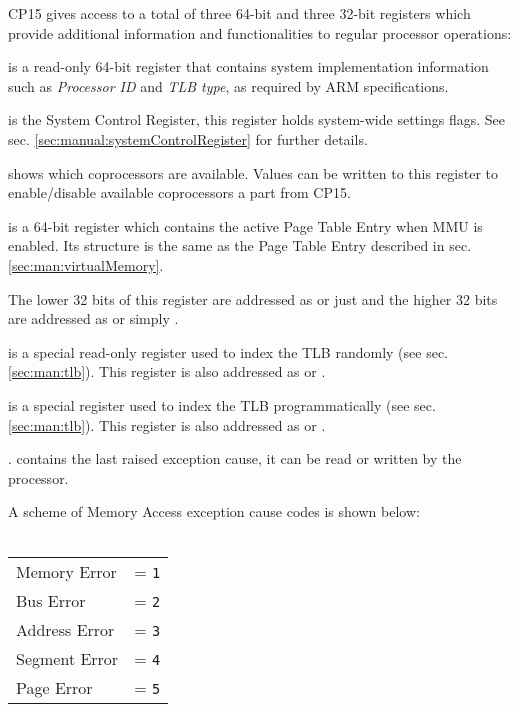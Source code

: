 

CP15 gives access to a total of three 64-bit and three 32-bit registers which provide additional information and functionalities to regular processor operations:

 is a read-only 64-bit register that contains system implementation information such as \emph{Processor ID} and \emph{TLB type}, as required by ARM specifications.

 is the System Control Register, this register holds system-wide settings flags.
See sec. \ref{sec:manual:systemControlRegister} for further details.

 shows which coprocessors are available. Values can be written to this register to enable/disable available coprocessors a part from CP15.


 is a 64-bit register which contains the active Page Table Entry when MMU is enabled. Its structure is the same as the Page Table Entry described in sec. \ref{sec:man:virtualMemory}.

The lower 32 bits of this register are addressed as  or just  and the higher 32 bits are addressed as  or simply .

 is a special read-only register used to index the TLB randomly (see sec. \ref{sec:man:tlb}).
This register is also addressed as  or .

 is a special register used to index the TLB programmatically (see sec. \ref{sec:man:tlb}).
This register is also addressed as  or .

. contains the last raised exception cause, it can be read or written by the processor.

A scheme of Memory Access exception cause codes is shown below:
\\
\\
\begin{tabular}{ll}
Memory Error & = \texttt{1}\\
Bus Error & = \texttt{2}\\
Address Error & = \texttt{3}\\
Segment Error & = \texttt{4}\\
Page Error & = \texttt{5}\\
\end{tabular}

